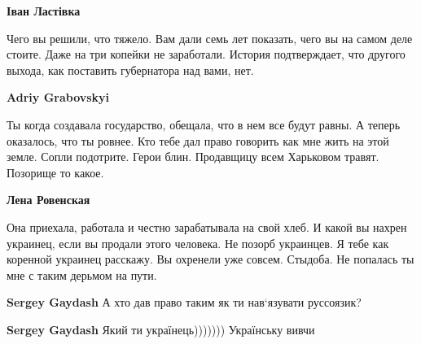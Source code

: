 \begin{itemize}
\begin{itemize}
\textbf{Іван Ластівка} 

Чего вы решили, что тяжело. Вам дали семь лет показать, чего вы на самом деле
стоите. Даже на три копейки не заработали. История подтверждает, что другого
выхода, как поставить губернатора над вами, нет.

 
\textbf{Adriy Grabovskyi} 

Ты когда создавала государство, обещала, что в нем все будут равны. А теперь
оказалось, что ты ровнее. Кто тебе дал право говорить как мне жить на этой
земле. Сопли подотрите. Герои блин. Продавщицу всем Харьковом травят. Позорище
то какое.


 
\textbf{Лена Ровенская} 

Она приехала, работала и честно зарабатывала на свой хлеб. И какой вы нахрен
украинец, если вы продали этого человека. Не позорб украинцев. Я тебе как
коренной украинец расскажу. Вы охренели уже совсем. Стыдоба. Не попалась ты мне
с таким дерьмом на пути.

 
\textbf{Sergey Gaydash} А хто дав право таким як ти нав‘язувати руссоязик?

 
\textbf{Sergey Gaydash} Який ти українець))))))) Українську вивчи

 

\end{itemize}
\end{itemize}
